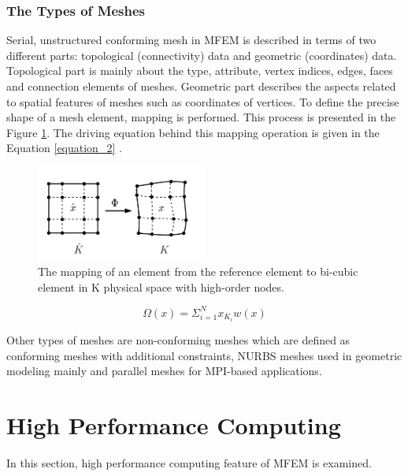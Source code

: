 \documentclass{article}
\begin{document}
\subsubsection{The Types of Meshes}
Serial, unstructured conforming mesh in MFEM is described in terms of two different parts: topological (connectivity) data and geometric (coordinates) data. Topological part is mainly about the type, attribute, vertex indices, edges, faces and connection elements of meshes. Geometric part describes the aspects related to spatial features of meshes such as coordinates of vertices.  
To define the precise shape of a mesh element, mapping is performed. This process is presented in the Figure \ref{figure_1}. The driving equation behind this mapping operation is given in the Equation \ref{equation_2} . 
\begin{figure}[hbt!]
    \centering
    \includegraphics[width=0.5\textwidth]{Figures/Figure_1.png}
    \caption{The mapping of an element from the reference element to bi-cubic element in K physical space with high-order nodes.}
    \label{figure_1}
\end{figure}
\begin{equation}
    \Omega(x) = \Sigma_{i=1}^N x_{K_i} w(x) 
    \label{equation_2}
\end{equation} \par
Other types of meshes are non-conforming meshes which are defined as conforming meshes with additional constraints, NURBS meshes used in geometric modeling mainly and parallel meshes for MPI-based applications. 
\section{High Performance Computing}
In this section, high performance computing feature of MFEM is examined.
\end{document}

